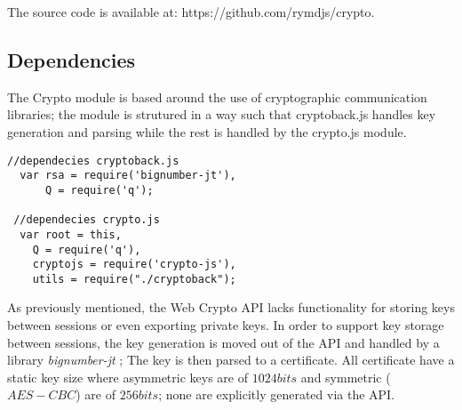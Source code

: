 The source code is available at: https://github.com/rymdjs/crypto.

\subsection{Dependencies}
The Crypto module is based around the use of cryptographic communication libraries; the module is strutured in a way such that cryptoback.js handles key generation and parsing while the rest is handled by the crypto.js module.
\begin{Code}
\begin{lstlisting}[caption={Included database operations}, label={lst:api}]
 //dependecies cryptoback.js
  var rsa = require('bignumber-jt'),
      Q = require('q');

 //dependecies crypto.js
  var root = this,
    Q = require('q'),
    cryptojs = require('crypto-js'),
    utils = require("./cryptoback");
\end{lstlisting}
\end{Code}
As previously mentioned, the Web Crypto API lacks functionality for storing keys between sessions or even exporting private keys. In order to support key storage between sessions, the key generation is moved out of the API and handled by a library \emph{bignumber-jt} \cite{Bignumber:Online}; The key is then parsed to a certificate.
All certificate have a static key size where asymmetric keys are of $1024bits$ and symmetric ($AES-CBC$) are of $256bits$; none are explicitly generated via the API.


